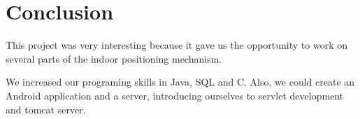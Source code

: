 \section{Conclusion}

This project was very interesting because it gave us the opportunity to work on
several parts of the indoor positioning mechanism.

We increased our programing skills in Java, SQL and C. Also, we could create an
Android application and a server, introducing ourselves to servlet development
and tomcat server.

